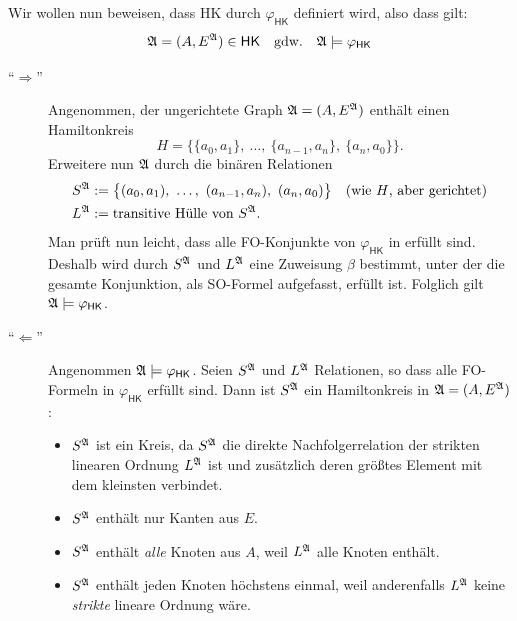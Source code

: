 \documentclass[fontsize=11pt, twoside=false, numbers=autoenddot]{scrbook}
\begin{document}
%
Wir wollen nun beweisen, dass HK durch $\varphi_{\textsf{HK}}$ definiert wird,
also dass gilt:
\[
  \mathfrak{A} = (A,E^\mathfrak{A}) \in \textsf{HK}
  \quad\text{gdw.}\quad
  \mathfrak{A} \models \varphi_{\textsf{HK}}
\]
\begin{beweis}
  \begin{description}
    \item[{\boldmath"`$\Rightarrow$"'}]
      Angenommen, der ungerichtete Graph $\mathfrak{A} = (A,E^\mathfrak{A})$ enthält einen Hamiltonkreis
      \[
        H = \big\{\{a_0,a_1\},~\dots,~\{a_{n-1},a_n\},~\{a_n,a_0\}\big\}.
      \]
      Erweitere nun $\mathfrak{A}$ durch die binären Relationen
      \begin{align*}
        S^\mathfrak{A} & := \big\{(a_0,a_1),~\dots,~(a_{n-1},a_n),~(a_n,a_0)\big\}\quad\text{(wie $H$, aber gerichtet)} \\
        L^\mathfrak{A} & := \text{transitive Hülle von~} S^\mathfrak{A}.
      \end{align*}
      Man prüft nun leicht, dass alle FO-Konjunkte von $\varphi_{\textsf{HK}}$ in \Amf erfüllt sind.
      Deshalb wird durch $S^\mathfrak{A}$ und $L^\mathfrak{A}$ eine Zuweisung $\beta$ bestimmt,
      unter der die gesamte Konjunktion, als SO-Formel aufgefasst, erfüllt ist.
      Folglich gilt $\mathfrak{A} \models \varphi_{\textsf{HK}}$.
    \item[{\boldmath"`$\Leftarrow$"'}]
      Angenommen $\mathfrak{A} \models \varphi_{\textsf{HK}}$.
      Seien $S^\mathfrak{A}$ und $L^\mathfrak{A}$ Relationen, so dass alle FO-Formeln in $\varphi_{\textsf{HK}}$
      erfüllt sind. Dann ist $S^\mathfrak{A}$ ein Hamiltonkreis in $\mathfrak{A} = (A,E^\mathfrak{A})$:
      \begin{itemize}
        \item
          $S^\mathfrak{A}$ ist ein Kreis, da $S^\mathfrak{A}$ die direkte Nachfolgerrelation der strikten
          linearen Ordnung $L^\mathfrak{A}$ ist und zusätzlich deren größtes Element mit dem kleinsten verbindet.
        \item
          $S^\mathfrak{A}$ enthält nur Kanten aus $E$.
        \item
          $S^\mathfrak{A}$ enthält \emph{alle} Knoten aus $A$, weil $L^\mathfrak{A}$ alle Knoten enthält.
        \item
          $S^\mathfrak{A}$ enthält jeden Knoten höchstens einmal, weil anderenfalls $L^\mathfrak{A}$ keine \emph{strikte} lineare Ordnung wäre.
      \end{itemize}
      \qedhere
  \end{description}
\end{beweis}%

\goodbreak
\end{document}
